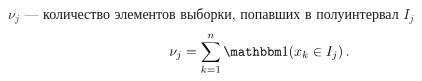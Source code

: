 $\nu_j$ --- количество элементов выборки, попавших в полуинтервал $I_j$
\begin{equation*}
  \nu_j = \sum_{k=1}^{n} \indicator{x_k \in I_j}.
\end{equation*}

\begin{comment}
Значит, гистограмма также может быть записана в следующем виде
$$q_n\left( y \right)
  = \frac{1}{n} \cdot \sum_{j=1}^{m} \left\{
    \frac{\indicator{y \in I_j}}{\left| I_j \right|}
    \cdot \sum_{k=1}^{n} \indicator{x_k\in I_j} \right\}$$
\end{comment}
\begin{comment}
Упростим формулу \eqref{eq:histogramPreFinal}, введя функцию
$\nu_j\left(X\right)$ \cite[стр.~68]{BorovkovMS},
которая считает количество элементов выборки $X=x_1, \dots, x_n$,
попавших в интервал $I_j$.
Это будет сумма индикаторов того, что элемент $x_k$ попал в $I_j$

$$\nu_j\left(X\right)
= \sum_{x\in X} \indicator{x\in I_j}
= \sum_{k=1}^n \indicator{x_k\in I_j}$$

Поскольку $\indicator{y\in I_j}$ зависит от $j$ и не зависит от $k$,
то его можно перенести во внешнюю сумму. Получаем следующую формулу
$$q_n\left(y\right)
= \sum_{j=1}^m \frac{\nu_j\left(X\right)}{n \cdot \left|I_j\right|}
  \cdot \indicator{y\in I_j}$$

У этой суммы только один ненулевой элемент,
так как $y$ может попасть только в один полуинтервал.
Тогда обозначим номер отрезка, в который попал $y$, через $k$ ($y\in I_k$),
а функцию $q_n\left(y\right)$ запишем как $q_n^k$
\begin{equation}\label{eq:histogram_borovkov}
  q_n^k = \frac{\nu_k\left(X\right)}{n \cdot \left|I_k\right|}
\end{equation}


Что мы тут видим?

Теперь $k$ --- номер столбика гистограммы. В математическом смысле это
номер интересующего нас полуинтервала --- того, в который попал $y$.

Высота столбика --- значение функции на определённом полуинтервале ---
пропорциональна количеству элементов, попавших в этот отрезок, что логично.

Делителю $\left|I_k\right|$ отведена особая роль --- он предотвращает
искажение гистограммы, когда длины отрезков разные; когда они одинаковые,
можно вынести длину как нормирующий множитель. То есть чем длиннее отрезок,
тем ниже столбик, так как элементы более размазаны по отрезку, что тоже логично.


\end{comment}
